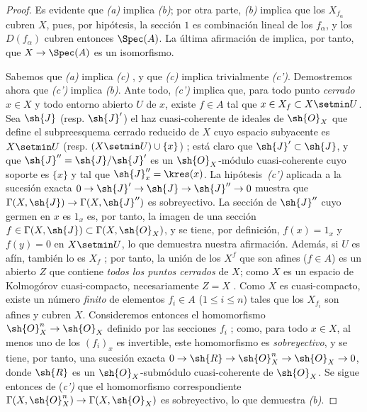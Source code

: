 \documentclass[oneside,10pt]{amsart}
\makeatletter
\renewcommand{\leq}{\leqslant}
\newcommand{\ega@arrow}[2]{\mathchoice{#1}{#2}{#2}{#2}}
\renewcommand{\to}{\ega@arrow{\longrightarrow}{\rightarrow}}
\newcommand{\oldpage}[2][]{\marginnote{\normalfont\footnotesize\textbf{#1}~|~#2}\ignorespaces}
\makeatother
\begin{document}
\begin{proof}
Es evidente que \emph{(a)} implica \emph{(b)};
por otra parte, \emph{(b)} implica que los $X_{f_\alpha}$ cubren $X$, pues, por hipótesis, la sección $1$ es combinación lineal de los $f_\alpha$, y los $D(f_\alpha)$ cubren entonces $\Spec(A)$.
La última afirmación de  implica, por tanto, que $X\to\Spec(A)$ es un isomorfismo.

Sabemos que \emph{(a)} implica \emph{(c)} , y que \emph{(c)} implica trivialmente \emph{(c')}.
Demostremos ahora que \emph{(c')} implica \emph{(b)}.
Ante todo, \emph{(c')} implica que, para todo punto \emph{cerrado} $x\in X$ y todo entorno abierto $U$ de $x$, existe $f\in A$ tal que $x\in X_f\subset X\setmin U$.
Sea $\sh{J}$ (resp. $\sh{J}'$) el haz cuasi-coherente de ideales de $\sh{O}_X$ que define el subpreesquema cerrado reducido de $X$ cuyo espacio subyacente es $X\setmin U$ (resp. $(X\setmin U)\cup\{x\}$) ;
está claro que $\sh{J}'\subset\sh{J}$, y que $\sh{J}''=\sh{J}/\sh{J}'$ es un $\sh{O}_X$-módulo cuasi-coherente cuyo soporte es $\{x\}$ y tal que $\sh{J}_x''=\kres(x)$.
La hipótesis~\emph{(c')} aplicada a la sucesión exacta $0\to\sh{J}'\to\sh{J}\to\sh{J}''\to0$ muestra que $\Gamma(X,\sh{J})\to\Gamma(X,\sh{J}'')$ es sobreyectivo.
La sección de $\sh{J}''$ cuyo germen en $x$ es $1_x$ es, por tanto, la imagen de una sección $f\in\Gamma(X,\sh{J})\subset\Gamma(X,\sh{O}_X)$, y se tiene, por definición, $f(x)=1_x$ y $f(y)=0$ en $X\setmin U$, lo que demuestra nuestra afirmación.
Además, si $U$ es afín, también lo es $X_f$ ; por tanto, la unión de los $X^f$ que son afines ($f\in A$) es un abierto $Z$ que contiene \emph{todos los puntos cerrados} de $X$;
como $X$ es un espacio de Kolmogórov cuasi-compacto, necesariamente $Z=X$ .
Como $X$ es cuasi-compacto, existe un número \emph{finito} de elementos $f_i\in A$ ($1\leq i\leq n$) tales que los $X_{f_i}$ son afines y cubren $X$.
Consideremos entonces el homomorfismo $\sh{O}_X^n\to\sh{O}_X$ definido por las secciones $f_i$ ;
como, para todo $x\in X$, al menos uno de los $(f_i)_x$ es invertible, este homomorfismo es \emph{sobreyectivo}, y se tiene, por tanto, una sucesión exacta $0\to\sh{R}\to\sh{O}_X^n\to\sh{O}_X\to0$, donde $\sh{R}$ es un $\sh{O}_X$-submódulo cuasi-coherente de $\sh{O}_X$.
Se sigue entonces
\oldpage[II]{98}
de (\emph{c')} que el homomorfismo correspondiente $\Gamma(X,\sh{O}_X^n)\to\Gamma(X,\sh{O}_X)$ es sobreyectivo, lo que demuestra \emph{(b)}.


\end{proof}
\end{document}
